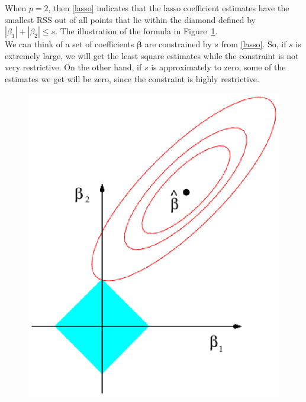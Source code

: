 \documentclass[12pt,a4paper]{article}%
\theoremstyle{definition}
\theoremstyle{plain}
\numberwithin{equation}{section}
\newcounter{subsubsubsection}[subsubsection]
\begin{document}
When $p=2$, then \eqref{lasso} indicates that the lasso coefficient estimates have the smallest RSS out of all points that lie within the diamond defined by $|\beta_{1}|+|\beta_{2}| \leq s$. 
The illustration of the formula in Figure~\ref{lassoOpti}. \\

We can think of a set of coefficients $\boldsymbol\beta$ are constrained by $s$ from \eqref{lasso}. 
So, if $s$ is extremely large, we will get the least square estimates while the constraint is not very restrictive.
On the other hand, if $s$ is approximately to zero, some of the estimates we get will be zero, since the constraint is highly restrictive. 


\subsubsubsection{\textcolor{blue}{The Variable Selection Property of the Lasso}}
\begin{figure}[H]
\centering
\includegraphics[scale=0.8]{images//6_7.eps}
\\~\\
\caption{ }\label{lassoOpti}
\end{figure}
\end{document}
